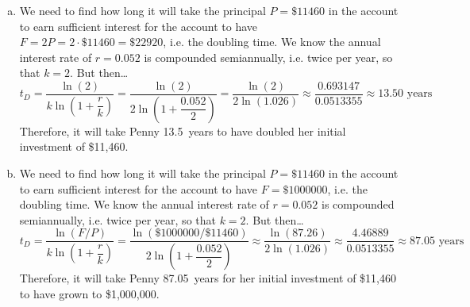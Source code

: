\documentclass[11pt,letterpaper]{article}
\begin{document}
\sol 
\begin{enumerate}[(a)]
\item We need to find how long it will take the principal $P= \$11460$ in the account to earn sufficient interest for the account to have $F= 2P= 2 \cdot \$11460= \$22920$, i.e. the doubling time. We know the annual interest rate of $r= 0.052$ is compounded semiannually, i.e. twice per year, so that $k= 2$. But then\dots
	\[
	t_D= \dfrac{\ln(2)}{k \ln \left(1 + \dfrac{r}{k} \right)}= \dfrac{\ln(2)}{2 \ln \left(1 + \dfrac{0.052}{2} \right)}= \dfrac{\ln(2)}{2 \ln(1.026)} \approx \dfrac{0.693147}{0.0513355} \approx 13.50 \text{ years}
	\]
Therefore, it will take Penny 13.5~years to have doubled her initial investment of \$11,460. \pspace

\item We need to find how long it will take the principal $P= \$11460$ in the account to earn sufficient interest for the account to have $F= \$1000000$, i.e. the doubling time. We know the annual interest rate of $r= 0.052$ is compounded semiannually, i.e. twice per year, so that $k= 2$. But then\dots 
	\[
	t_D= \dfrac{\ln(F/P)}{k \ln \left(1 + \dfrac{r}{k} \right)}= \dfrac{\ln(\$1000000/\$11460)}{2 \ln \left(1 + \dfrac{0.052}{2} \right)} \approx \dfrac{\ln(87.26)}{2 \ln(1.026)} \approx \dfrac{4.46889}{0.0513355} \approx 87.05 \text{ years}
	\]
Therefore, it will take Penny 87.05~years for her initial investment of \$11,460 to have grown to \$1,000,000. 
\end{enumerate}
\end{document}
